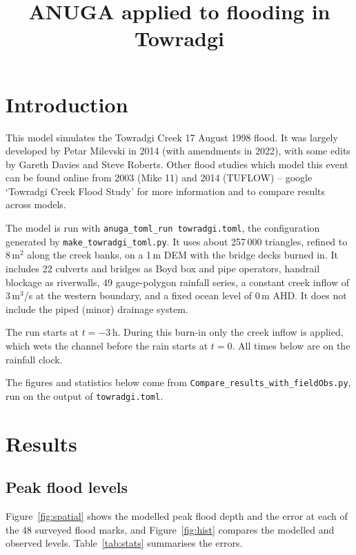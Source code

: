 \documentclass{article}
\begin{document}
\title{ANUGA applied to flooding in Towradgi}

\maketitle

\section{Introduction}
This model simulates the Towradgi Creek 17 August 1998 flood. It was largely
developed by Petar Milevski in 2014 (with amendments in 2022), with some edits
by Gareth Davies and Steve Roberts. Other flood studies which model this event
can be found online from 2003 (Mike 11) and 2014 (TUFLOW) -- google `Towradgi
Creek Flood Study' for more information and to compare results across models.

The model is run with \texttt{anuga\_toml\_run towradgi.toml}, the
configuration generated by \texttt{make\_towradgi\_toml.py}. It uses about
257\,000 triangles, refined to 8\,m$^2$ along the creek banks, on a 1\,m DEM
with the bridge decks burned in. It includes 22 culverts and bridges as Boyd
box and pipe operators, handrail blockage as riverwalls, 49 gauge-polygon
rainfall series, a constant creek inflow of 3\,m$^3$/s at the western
boundary, and a fixed ocean level of 0\,m AHD. It does not include the piped
(minor) drainage system.

The run starts at $t = -3$\,h. During this burn-in only the creek inflow is
applied, which wets the channel before the rain starts at $t = 0$. All times
below are on the rainfall clock.

The figures and statistics below come from \texttt{Compare\_results\_with\_fieldObs.py},
run on the output of \texttt{towradgi.toml}.

\section{Results}

\subsection{Peak flood levels}

Figure~\ref{fig:spatial} shows the modelled peak flood depth and the error at
each of the 48 surveyed flood marks, and Figure~\ref{fig:hist} compares the
modelled and observed levels. Table~\ref{tab:stats} summarises the errors.
\end{document}
